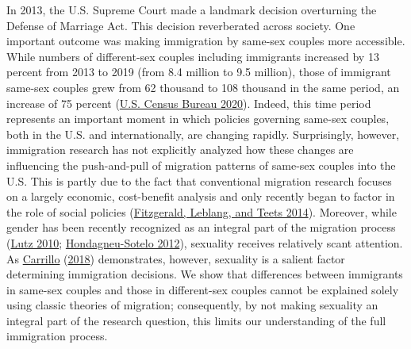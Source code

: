 \documentclass[
  11pt,
]{article}
\begin{document}
In 2013, the U.S. Supreme Court made a landmark decision overturning the Defense of Marriage Act. This decision reverberated across society. One important outcome was making immigration by same-sex couples more accessible. While numbers of different-sex couples including immigrants increased by 13 percent from 2013 to 2019 (from 8.4 million to 9.5 million), those of immigrant same-sex couples grew from 62 thousand to 108 thousand in the same period, an increase of 75 percent (\protect\hyperlink{ref-u.s.censusbureau_2020}{U.S. Census Bureau 2020}). Indeed, this time period represents an important moment in which policies governing same-sex couples, both in the U.S. and internationally, are changing rapidly. Surprisingly, however, immigration research has not explicitly analyzed how these changes are influencing the push-and-pull of migration patterns of same-sex couples into the U.S. This is partly due to the fact that conventional migration research focuses on a largely economic, cost-benefit analysis and only recently began to factor in the role of social policies (\protect\hyperlink{ref-fitzgerald_2014}{Fitzgerald, Leblang, and Teets 2014}). Moreover, while gender has been recently recognized as an integral part of the migration process (\protect\hyperlink{ref-lutz_2010}{Lutz 2010}; \protect\hyperlink{ref-hondagneu-sotelo_2012}{Hondagneu-Sotelo 2012}), sexuality receives relatively scant attention. As \protect\hyperlink{ref-carrillo_2018}{Carrillo} (\protect\hyperlink{ref-carrillo_2018}{2018}) demonstrates, however, sexuality is a salient factor determining immigration decisions. We show that differences between immigrants in same-sex couples and those in different-sex couples cannot be explained solely using classic theories of migration; consequently, by not making sexuality an integral part of the research question, this limits our understanding of the full immigration process.
\end{document}
